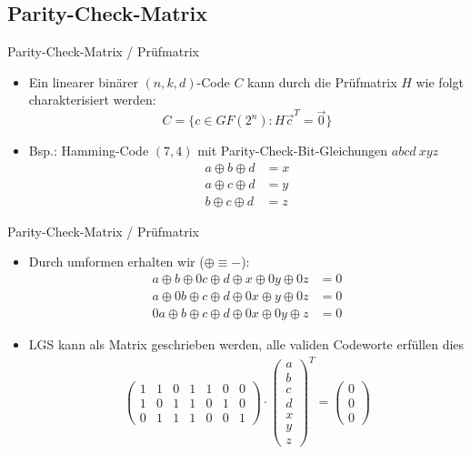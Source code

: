 \documentclass[11pt%
,aspectratio=169%
]{beamer}
\begin{document}
\subsection{Parity-Check-Matrix}
\begin{frame}{Parity-Check-Matrix / Prüfmatrix}
    \begin{itemize}
        \item Ein linearer binärer $(n,k,d)$-Code $C$ kann durch die Prüfmatrix $H$ wie folgt charakterisiert werden:
			\[C =\{c \in GF(2^n) : H\vec{c}^T =\vec{0}\} \] 
 
        \item Bsp.: Hamming-Code $(7,4)$ mit Parity-Check-Bit-Gleichungen $abcd~xyz$
        \begin{align*}
		    a \oplus b \oplus d &= x\\
		    a \oplus c \oplus d &= y\\
		    b \oplus c \oplus d &= z
		\end{align*}

    \end{itemize}
\end{frame}

\begin{frame}{Parity-Check-Matrix / Prüfmatrix}   
\begin{itemize}
	\item Durch umformen erhalten wir ($\oplus \equiv -$):
		\begin{align*}
		    a \oplus b \oplus 0c \oplus d \oplus x \oplus 0y \oplus 0z &= 0\\
		    a \oplus 0b \oplus c \oplus d \oplus 0x \oplus  y \oplus 0z &= 0\\
		    0a \oplus b \oplus c \oplus d \oplus 0x \oplus 0y \oplus z &= 0
		\end{align*}
	

		\item LGS kann als Matrix geschrieben werden, alle validen Codeworte erfüllen dies
		\begin{align*}
		    \begin{pmatrix}
		            1 & 1 & 0 & 1 & 1 & 0 & 0 \\
		            1 & 0 & 1 & 1 & 0 & 1 & 0 \\
		            0 & 1 & 1 & 1 & 0 & 0 & 1 
		    \end{pmatrix} 
		    \cdot 
		    \begin{pmatrix}
		            a\\b\\c\\d\\x\\y\\z
		    \end{pmatrix}^T
		    =
		    \begin{pmatrix}
		          0\\0\\0  
		    \end{pmatrix}
		\end{align*}
    \end{itemize}
\end{frame}
\end{document}

